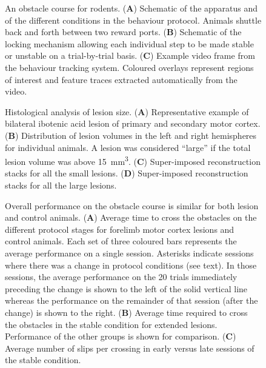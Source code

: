 
\begin{figure}
\centering

\caption{An obstacle course for rodents. (\textbf{A}) Schematic of the apparatus and of the different conditions in the behaviour protocol. Animals shuttle back and forth between two reward ports. (\textbf{B}) Schematic of the locking mechanism allowing each individual step to be made stable or unstable on a trial-by-trial basis. (\textbf{C}) Example video frame from the behaviour tracking system. Coloured overlays represent regions of interest and feature traces extracted automatically from the video. }
\label{fig:assay}
\end{figure}

\begin{figure}
\centering

\caption{Histological analysis of lesion size. (\textbf{A}) Representative example of bilateral ibotenic acid lesion of primary and secondary motor cortex. (\textbf{B}) Distribution of lesion volumes in the left and right hemispheres for individual animals. A lesion was considered ``large'' if the total lesion volume was above \SI{15}{\milli\meter\cubed}. (\textbf{C}) Super-imposed reconstruction stacks for all the small lesions. (\textbf{D}) Super-imposed reconstruction stacks for all the large lesions.}
\label{fig:histology}
\end{figure}

\begin{figure}
\centering

\caption{Overall performance on the obstacle course is similar for both lesion and control animals. (\textbf{A}) Average time to cross the obstacles on the different protocol stages for forelimb motor cortex lesions and control animals. Each set of three coloured bars represents the average performance on a single session. Asterisks indicate sessions where there was a change in protocol conditions (see text). In those sessions, the average performance on the 20 trials immediately preceding the change is shown to the left of the solid vertical line whereas the performance on the remainder of that session (after the change) is shown to the right. (\textbf{B}) Average time required to cross the obstacles in the stable condition for extended lesions. Performance of the other groups is shown for comparison. (\textbf{C}) Average number of slips per crossing in early versus late sessions of the stable condition.}
\label{fig:learning}
\end{figure}

